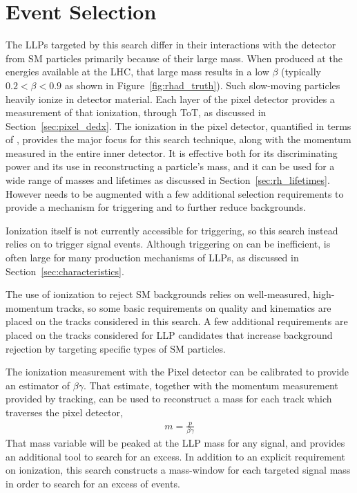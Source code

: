 \chapter{Event Selection}

\label{ch:selection}

The \acp{LLP} targeted by this search differ in their interactions with the detector from \ac{SM} particles primarily because of their large mass. 
When produced at the energies available at the \ac{LHC}, that large mass results in a low $\beta$ (typically $0.2 < \beta < 0.9$ as shown in Figure~\ref{fig:rhad_truth}). 
Such slow-moving particles heavily ionize in detector material. 
Each layer of the pixel detector provides a measurement of that ionization, through \ac{ToT}, as discussed in Section~\ref{sec:pixel_dedx}. 
The ionization in the pixel detector, quantified in terms of \dedx, provides the major focus for this search technique, along with the momentum measured in the entire inner detector.
It is effective both for its discriminating power and its use in reconstructing a particle's mass, and it can be used for a wide range of masses and lifetimes as discussed in Section~\ref{sec:rh_lifetimes}. 
However \dedx needs to be augmented with a few additional selection requirements to provide a mechanism for triggering and to further reduce backgrounds.

Ionization itself is not currently accessible for triggering, so this search instead relies on \met to trigger signal events.
Although triggering on \met can be inefficient, \met is often large for many production mechanisms of \acp{LLP}, as discussed in Section~\ref{sec:characteristics}.

The use of ionization to reject \ac{SM} backgrounds relies on well-measured, high-momentum tracks, so some basic requirements on quality and kinematics are placed on the tracks considered in this search. 
A few additional requirements are placed on the tracks considered for \ac{LLP} candidates that increase background rejection by targeting specific types of \ac{SM} particles. 

The ionization measurement with the Pixel detector can be calibrated to provide an estimator of $\beta\gamma$. That estimate, together with the momentum measurement provided by tracking, can be used to reconstruct a mass for each track which traverses the pixel detector,
\begin{align*}
m = \frac{p}{\beta\gamma}
\end{align*}
That mass variable will be peaked at the \ac{LLP} mass for any signal, and provides an additional tool to search for an excess.
In addition to an explicit requirement on ionization, this search constructs a mass-window for each targeted signal mass in order to search for an excess of events.

